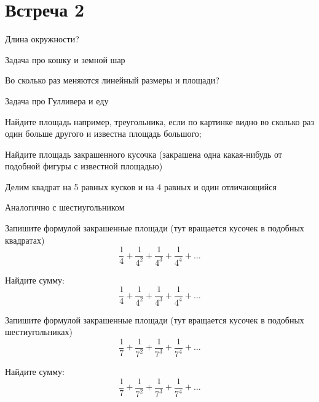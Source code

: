 \documentclass[a4paper, 12pt]{article}
\begin{document}
\section{Встреча 2}

Длина окружности?

Задача про кошку и земной шар

Во сколько раз меняются линейный размеры и площади?

Задача про Гулливера и еду

Найдите площадь например, треугольника, если по картинке видно во сколько раз один больше другого и известна площадь большого;

Найдите площадь закрашенного кусочка (закрашена одна какая-нибудь от подобной фигуры с известной площадью)


Делим квадрат на 5 равных кусков и на 4 равных и один отличающийся

Аналогично с шестиугольником

Запишите формулой закрашенные площади (тут вращается кусочек в подобных квадратах)
\[
  \frac{1}{4} + \frac{1}{4^2} + \frac{1}{4^3} + \frac{1}{4^4} + \ldots
\]


Найдите сумму:
\[
  \frac{1}{4} + \frac{1}{4^2} + \frac{1}{4^3} + \frac{1}{4^4} + \ldots
\]



Запишите формулой закрашенные площади (тут вращается кусочек в подобных шестиугольниках)
\[
  \frac{1}{7} + \frac{1}{7^2} + \frac{1}{7^3} + \frac{1}{7^4} + \ldots
\]



Найдите сумму:
\[
  \frac{1}{7} + \frac{1}{7^2} + \frac{1}{7^3} + \frac{1}{7^4} + \ldots
\]
\end{document}
